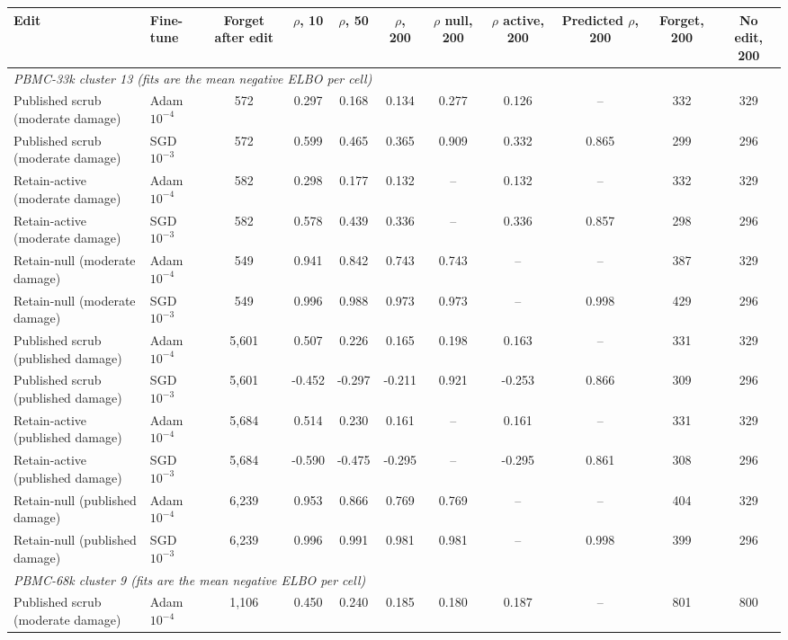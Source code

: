 \begin{tabular}{llccccccccc}
\toprule
Edit & Fine-tune & Forget after edit & $\rho$, 10 & $\rho$, 50 & $\rho$, 200 & $\rho$ null, 200 & $\rho$ active, 200 & Predicted $\rho$, 200 & Forget, 200 & No edit, 200 \\
\midrule
\multicolumn{11}{l}{\emph{PBMC-33k cluster 13 (fits are the mean negative ELBO per cell)}} \\
Published scrub (moderate damage) & Adam $10^{-4}$ & 572 & 0.297 & 0.168 & 0.134 & 0.277 & 0.126 & -- & 332 & 329 \\
Published scrub (moderate damage) & SGD $10^{-3}$ & 572 & 0.599 & 0.465 & 0.365 & 0.909 & 0.332 & 0.865 & 299 & 296 \\
Retain-active (moderate damage) & Adam $10^{-4}$ & 582 & 0.298 & 0.177 & 0.132 & -- & 0.132 & -- & 332 & 329 \\
Retain-active (moderate damage) & SGD $10^{-3}$ & 582 & 0.578 & 0.439 & 0.336 & -- & 0.336 & 0.857 & 298 & 296 \\
Retain-null (moderate damage) & Adam $10^{-4}$ & 549 & 0.941 & 0.842 & 0.743 & 0.743 & -- & -- & 387 & 329 \\
Retain-null (moderate damage) & SGD $10^{-3}$ & 549 & 0.996 & 0.988 & 0.973 & 0.973 & -- & 0.998 & 429 & 296 \\
Published scrub (published damage) & Adam $10^{-4}$ & 5,601 & 0.507 & 0.226 & 0.165 & 0.198 & 0.163 & -- & 331 & 329 \\
Published scrub (published damage) & SGD $10^{-3}$ & 5,601 & -0.452 & -0.297 & -0.211 & 0.921 & -0.253 & 0.866 & 309 & 296 \\
Retain-active (published damage) & Adam $10^{-4}$ & 5,684 & 0.514 & 0.230 & 0.161 & -- & 0.161 & -- & 331 & 329 \\
Retain-active (published damage) & SGD $10^{-3}$ & 5,684 & -0.590 & -0.475 & -0.295 & -- & -0.295 & 0.861 & 308 & 296 \\
Retain-null (published damage) & Adam $10^{-4}$ & 6,239 & 0.953 & 0.866 & 0.769 & 0.769 & -- & -- & 404 & 329 \\
Retain-null (published damage) & SGD $10^{-3}$ & 6,239 & 0.996 & 0.991 & 0.981 & 0.981 & -- & 0.998 & 399 & 296 \\
\midrule
\multicolumn{11}{l}{\emph{PBMC-68k cluster 9 (fits are the mean negative ELBO per cell)}} \\
Published scrub (moderate damage) & Adam $10^{-4}$ & 1,106 & 0.450 & 0.240 & 0.185 & 0.180 & 0.187 & -- & 801 & 800 \\

\end{tabular}
